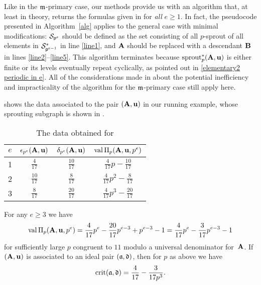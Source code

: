 \documentclass{amsart}
\begin{document}
\begin{remark}[An algorithm]
   \label{algorithm: R}
   Like in the $\mathfrak{m}$-primary case, our methods provide us with an algorithm that, at least in theory, returns the formulas given in  for \emph{all} $e \ge 1$.
   In fact, the pseudocode presented in Algorithm~\ref{alg} applies to the general case with minimal modifications:
   $\mathcal{S}_{\mathsf{p}^e}$ should be defined as the set consisting of all $p$-sprout of all elements in $\mathcal{S}^*_{\mathsf{p}^{e-1}}$ in line \ref{line1}, and $\mathbf{A}$ should be replaced with a descendant $\mathbf{B}$ in lines \ref{line2}--\ref{line5}.
   This algorithm terminates because $\operatorname{sprout}^*_p(\mathbf{A},\mathbf{u})$ is either finite or its levels eventually repeat cyclically, as pointed out in \eqref{elementary2 periodic in e}.
   All of the considerations made in  about the potential inefficiency and impracticality of the algorithm for the $\mathfrak{m}$-primary case still apply here.
\end{remark}

\begin{example}
   \label{ex: ft.5}
    shows the data associated to the pair $(\mathbf{A},\mathbf{u})$ in our running example, whose sprouting subgraph is shown in .
   \begin{table}
      \begin{center}
         \begingroup
         \setlength{\tabcolsep}{8pt} %
         \renewcommand{\arraystretch}{1.4} %
         \begin{tabular}{cccc}
           \toprule
           $e$ & $\epsilon_{p^e}(\mathbf{A},\mathbf{u})$ & $\delta_{p^e}(\mathbf{A},\mathbf{u})$ & $\operatorname{val}\Pi_p(\mathbf{A},\mathbf{u},p^e)$ \\
           \midrule
           1 & $\frac{4}{17}$ & $\frac{10}{17}$ & $\frac{4}{17}p - \frac{10}{17}$\\
           2 & $\frac{10}{17}$ & $\frac{8}{17}$ & $\frac{4}{17}p^2 - \frac{8}{17}$ \\
           3 & $\frac{8}{17}$ & $\frac{20}{17}$ & $\frac{4}{17}p^3 - \frac{20}{17}$\\
           \bottomrule
         \end{tabular}
         \endgroup
      \end{center}
      \caption{The data obtained for }
      \label{table: running example data}
   \end{table}
   For any $e \ge 3$ we have
   \[
      \operatorname{val}\Pi_p(\mathbf{A},\mathbf{u},p^e) = \frac{4}{17}p^e - \frac{20}{17}p^{e-3} + p^{e-3} - 1
       = \frac{4}{17}p^e - \frac{3}{17}p^{e-3}  - 1
    \]
    for sufficiently large $p$ congruent to $11$ modulo a universal denominator for~$\mathbf{A}$.
    If $(\mathbf{A},\mathbf{u})$ is associated to an ideal pair $(\mathfrak{a},\mathfrak{d})$, then for $p$ as above we have
    \[\operatorname{crit}(\mathfrak{a},\mathfrak{d}) = \frac{4}{17} - \frac{3}{17p^3}.\]
\end{example}
\end{document}
